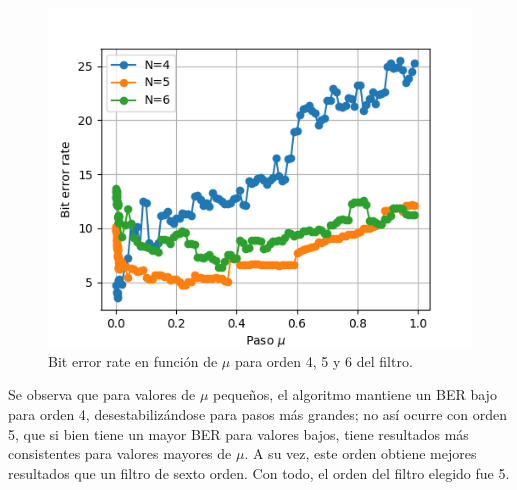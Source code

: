 \documentclass[main.tex]{subfiles}
\begin{document}
\begin{figure}[H]
    \centering
    \includegraphics[scale=0.6]{imagenes/N_filter.png}
    \caption{Bit error rate en función de $\mu$ para orden 4, 5 y 6 del filtro.}
\end{figure}

Se observa que para valores de $\mu$ pequeños, el algoritmo mantiene un BER bajo 
para orden 4, desestabilizándose para pasos más grandes; no así ocurre con orden 5, 
que si bien tiene un mayor BER para valores bajos, tiene resultados más consistentes
para valores mayores de $\mu$. A su vez, este orden obtiene mejores resultados que un 
filtro de sexto orden. Con todo, el orden del filtro elegido fue 5.
\end{document}
